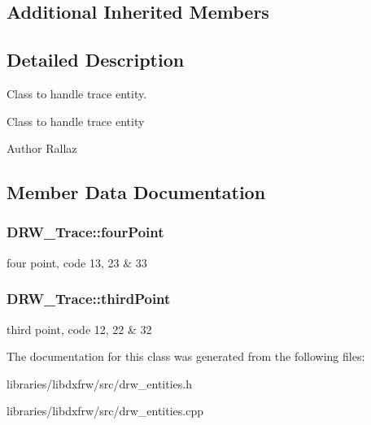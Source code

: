 \subsection*{Additional Inherited Members}


\subsection{Detailed Description}
Class to handle trace entity. 

Class to handle trace entity \begin{DoxyAuthor}{Author}
Rallaz 
\end{DoxyAuthor}


\subsection{Member Data Documentation}
\hypertarget{classDRW__Trace_a96d7a3b877a7f26f6a8b8cdbc9ced660}{
\subsubsection[{four\-Point}]{ D\-R\-W\-\_\-\-Trace\-::four\-Point}}\label{classDRW__Trace_a96d7a3b877a7f26f6a8b8cdbc9ced660}
four point, code 13, 23 \& 33 \hypertarget{classDRW__Trace_adadabbf354ee19cfe3869c790e6de3ec}{
\subsubsection[{third\-Point}]{ D\-R\-W\-\_\-\-Trace\-::third\-Point}}\label{classDRW__Trace_adadabbf354ee19cfe3869c790e6de3ec}
third point, code 12, 22 \& 32 

The documentation for this class was generated from the following files\-:\begin{DoxyCompactItemize}
\item 
libraries/libdxfrw/src/drw\-\_\-entities.\-h\item 
libraries/libdxfrw/src/drw\-\_\-entities.\-cpp\end{DoxyCompactItemize}
